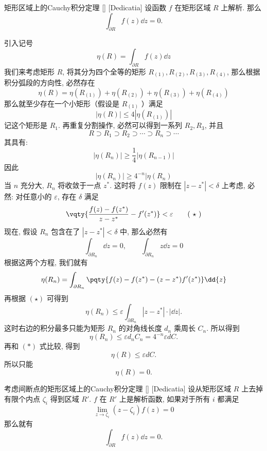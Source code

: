 \documentclass[UTF8]{ctexart}
\begin{document}
        \begin{thm}
            [UUID]
            {矩形区域上的Cauchy积分定理}
            []
            [Dedicatia]
            设函数 \(f\) 在矩形区域 \(R\) 上解析. 那么
            \[\int_{\partial R}f(z)\dd{z}=0.\]
        \end{thm}

        \begin{prf}
            引入记号
            \[\eta(R)=\int_{\partial R}f(z)\dd{z}\]
            我们来考虑矩形 \(R\), 将其分为四个全等的矩形 \(R_{(1)}, R_{(2)}, R_{(3)}, R_{(4)}\), 那么根据积分弧段的方向性, 必然存在
            \[\eta(R)=\eta(R_{(1)})+\eta(R_{(2)})+\eta(R_{(3)})+\eta(R_{(4)})\]
            那么就至少存在一个小矩形（假设是 \(R_{(1)}\) ）满足
            \[|\eta(R)|\leqslant 4|\eta(R_{(1)})|\]
            记这个矩形是 \(R_1\). 再重复分割操作, 必然可以得到一系列 \(R_2, R_3\), 并且
            \[R\supset R_1\supset R_2\supset\cdots\supset R_n\supset\cdots\]
            其具有: 
            \[|\eta(R_n)|\geqslant \frac{1}{4}|\eta(R_{n-1})|\]
            因此
            \[|\eta(R_n)|\geqslant 4^{-n}|\eta(R_n)\tag{ \(\ast\) }\]
            当 \(n\) 充分大,  \(R_n\) 将收敛于一点 \(z^*\). 这时将 \(f(z)\) 限制在 \(|z-z^*|<\delta \) 上考虑, 必然: 对任意小的 \(\varepsilon\), 存在 \(\delta\) 满足
            \[\vqty{\frac{f(z)-f(z^*)}{z-z^*}-f'(z^*)}<\varepsilon\tag{ \(\star\) }\]
            现在, 假设 \(R_n\) 包含在了 \(|z-z^*|<\delta\) 中, 那么必然有
            \[\int_{\partial R_n}\dd{z}=0,\qquad\int_{\partial R_n}z\dd{z}=0\]
            根据这两个方程, 我们就有
            \[\eta(R_n)=\int_{\partial R_n}\pqty{f(z)-f(z^*)-(z-z^*)f'(z^*)}\dd{z}\]
            再根据 \((\star)\) 可得到
            \[\eta(R_n)\leqslant\varepsilon\int_{\partial R_n}|z-z^*|\cdot|\dd z|. \]
            这时右边的积分最多只能为矩形 \(R_n\) 的对角线长度 \(d_n\) 乘周长 \(C_n\). 所以得到
            \[\eta(R_n)\leqslant\varepsilon d_nC_n=4^{-n}\varepsilon dC.\]
            再和 \((\ast)\) 式比较, 得到
            \[\eta(R)\leqslant\varepsilon dC.\]
            所以只能
            \[\eta(R)=0.\]
        \end{prf}

        \begin{thm}
            [UUID]
            {考虑间断点的矩形区域上的Cauchy积分定理}
            []
            [Dedicatia]
            设从矩形区域 \(R\) 上去掉有限个内点 \(\zeta_i\) 得到区域 \(R'\).  \(f\) 在 \(R'\) 上是解析函数, 如果对于所有 \(i\) 都满足
            \[\lim_{z\to\zeta_i }(z-\zeta_i)f(z)=0\]
            那么就有
            \[\int_{\partial R}f(z)\dd{z}=0.\]
        \end{thm}
\end{document}
